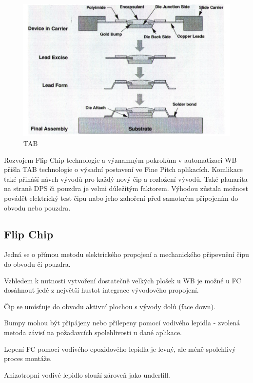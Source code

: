 \begin{figure}[h]
   \begin{center}
     \includegraphics[scale=0.6]{images/TAB.png}
   \end{center}
   \caption{TAB}
\end{figure}

Rozvojem Flip Chip technologie a významným pokrokům v automatizaci WB přišla TAB
technologie o výsadní postavení ve Fine Pitch aplikacích. Komlikace také přináší návrh vývodů pro každý nový čip a rozložení vývodů. Také planarita na straně DPS či pouzdra je velmi důležitým faktorem. Výhodou zůstala možnost povádět elektrický test čipu nabo jeho zahoření před samotným připojením do obvodu nebo pouzdra.

\subsection{Flip Chip}
Jedná se o přímou metodu elektrického propojení a
mechanického připevnění čipu do obvodu či pouzdra.

Vzhledem k nutnosti vytvoření dostatečně velkých plošek u WB je možné u FC dosáhnout jedé z největší hustot integrace vývodového propojení.

Čip se umísťuje do obvodu aktivní plochou s vývody dolů (face down).

Bumpy mohou být připájeny nebo přilepeny pomocí vodivého lepidla - zvolená metoda
závisí na požadavcích spolehlivosti u dané aplikace.

Lepení FC pomocí vodivého epoxidového lepidla je levný, ale méně spolehlivý proces montáže. 

Anizotropní vodivé lepidlo slouží zároveň jako underfill.

